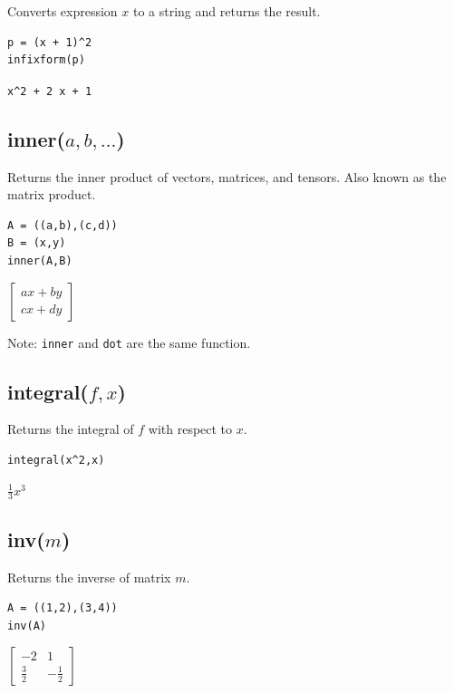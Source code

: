\documentclass[12pt]{article}
\begin{document}
Converts expression $x$ to a string and returns the result.

{\color{blue}
\begin{verbatim}
p = (x + 1)^2
infixform(p)
\end{verbatim}
}

\noindent
\verb$x^2 + 2 x + 1$

\subsection*{inner($a,b,\ldots$)}

Returns the inner product of vectors, matrices, and tensors.
Also known as the matrix product.

{\color{blue}
\begin{verbatim}
A = ((a,b),(c,d))
B = (x,y)
inner(A,B)
\end{verbatim}
}

\noindent
$\displaystyle
\begin{bmatrix}
ax+by
\\[1ex]
cx+dy
\end{bmatrix}
$

\bigskip
\noindent
Note: {\tt inner} and {\tt dot} are the same function.

\subsection*{integral($f,x$)}

Returns the integral of $f$ with respect to $x$.

{\color{blue}
\begin{verbatim}
integral(x^2,x)
\end{verbatim}
}

\noindent
$\displaystyle \tfrac{1}{3}x^3$

\subsection*{inv($m$)}

Returns the inverse of matrix $m$.

{\color{blue}
\begin{verbatim}
A = ((1,2),(3,4))
inv(A)
\end{verbatim}
}

\noindent
$\displaystyle
\begin{bmatrix}
-2 & 1
\\[1ex]
\tfrac{3}{2} & -\tfrac{1}{2}
\end{bmatrix}
$
\end{document}
